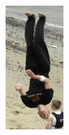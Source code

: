 \begin{figure}[h]
\begin{subfigure}[b]{.1\textwidth}
  \includegraphics[height=2\textwidth]{./images/LSP2}
\end{subfigure}
\begin{subfigure}[b]{.2\textwidth}
	\centering

\end{subfigure}
\end{figure}
